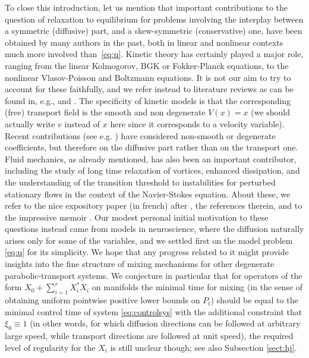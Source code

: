 \documentclass[12pt]{article}
\begin{document}
\medskip

To close this introduction, let us mention that important contributions to 
the question of relaxation to equilibrium for problems involving the 
interplay between a symmetric (diffusive) part, and a skew-symmetric 
(conservative) one, have been obtained by many authors in the past, both in linear 
and nonlinear contexts much more involved than~\eqref{eq:u}.  
Kinetic theory has certainly played a major role, 
ranging from the linear Kolmogorov, BGK or Fokker-Planck equations, to the
nonlinear Vlasov-Poisson and Boltzmann equations. It is not our aim to try
to account for these faithfully, and we refer instead to literature 
reviews as can be found in, e.g., \cite{Herau18} and \cite{BeFaLeSt22}. The specificity  
of kinetic models is that the corresponding (free) transport field is the smooth 
and non degenerate $V(x) = x$ (we should 
actually write $v$ instead of $x$ here since it corresponds to a velocity variable). 
Recent contributions (see e.g. \cite{GoImMoVa19, HeHeHuMo22, AnHeGuLoMoRe24}) 
have considered non-smooth or degenerate coefficients, 
but therefore on the diffusive part rather than on the transport one.  
Fluid mechanics, as already mentioned, has also been an important contributor, 
including the study of long time relaxation of vortices, enhanced dissipation, 
and the understanding of the transition threshold to instabilities for perturbed  
stationary flows in the context of the Navier-Stokes equation. About these, we refer to 
the nice expository paper \cite{Gallay21} (in french) after \cite{LiWeiZha20}, the references therein,  
and to the impressive memoir \cite{CheWeiZha24}. 
Our modest personal initial motivation to these questions instead came from models 
in neuroscience, where the 
diffusion naturally arises only for some of the variables, and we settled
first on the model problem \eqref{eq:u} for its simplicity. 
We hope that any progress related to it might provide insights into the fine 
structure of mixing mechanisms for other degenerate parabolic-transport systems. 
We conjecture in particular that for operators of the form $X_0 + \sum_{i=1}^r X_i^*X_i$ 
on manifolds the minimal time for mixing (in the sense of obtaining uniform pointwise 
positive lower bounds on $P_t$) should be equal to the minimal control time of system 
\eqref{eq:controlsys} with the additional constraint that $\xi_0 \equiv 1$ (in other 
words, for which diffusion directions can be followed at arbitrary large speed, 
while transport directions are followed at unit speed), the required level of 
regularity for the $X_i$ is still unclear though; see also Subsection \ref{sect:hj}. 
\end{document}
